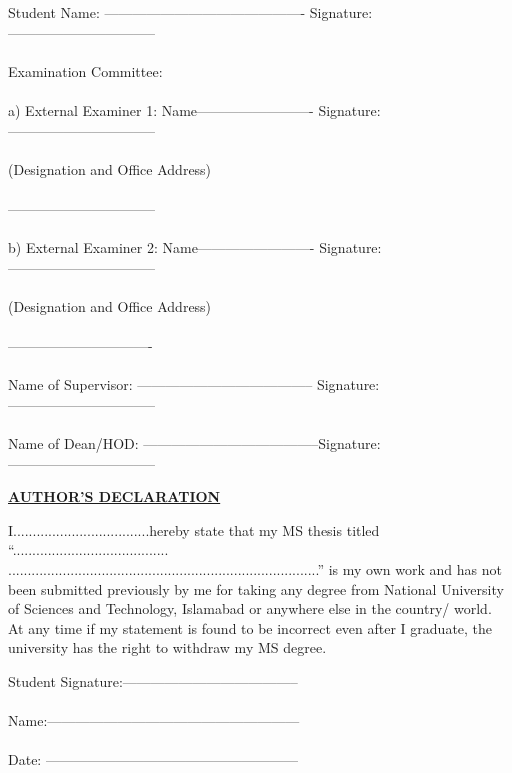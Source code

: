 \documentclass[a4paper, 12pt, twoside]{report}
\theoremstyle{definition}
\begin{document}
Student Name: -------------------------------------------  
    Signature: -------------------------------- \\~\\			Examination Committee:\\~\\
    a)  External Examiner 1: Name-------------------------	      
      Signature:-------------------------------- \\~\\			
	(Designation and Office Address)\\~\\
--------------------------------\\~\\
b)  External Examiner 2: Name-------------------------	Signature:-------------------------------- 	\\	~\\	
	(Designation and Office Address)\\~\\
-------------------------------\\~\\
Name of Supervisor: -------------------------------------- 	Signature:--------------------------------\\	~\\		
Name of Dean/HOD: --------------------------------------Signature:--------------------------------\\			
								
\NoBgThispage
\newpage
{}
	\thispagestyle{empty}
\begin{center}
\textbf{\underline {AUTHOR’S DECLARATION}}
\end{center}

    I...................................hereby state that my MS thesis titled “........................................\\................................................................................” is my own work and has not been submitted previously by me for taking any degree from National University of Sciences and Technology, Islamabad or anywhere else in the country/ world.
\\
At any time if my statement is found to be incorrect even after I graduate, the university has the right to withdraw my MS degree.

\vspace{1cm}
\begin{flushright}
Student Signature:--------------------------------------\\~\\
Name:------------------------------------------------------ \\~\\					
Date: ------------------------------------------------------ \\			\end{flushright}
\end{document}

